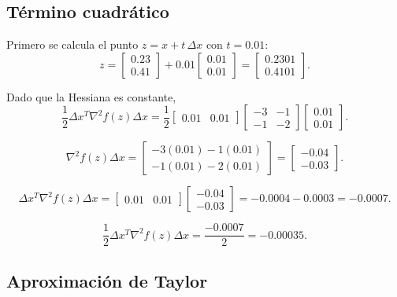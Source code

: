 \documentclass[12pt]{article}
\begin{document}
\subsection{Término cuadrático}

Primero se calcula el punto \(z = x + t\,\Delta x\) con \(t = 0.01\):
\[
z =
\begin{bmatrix} 0.23 \\ 0.41 \end{bmatrix}
+ 0.01
\begin{bmatrix} 0.01 \\ 0.01 \end{bmatrix}
=
\begin{bmatrix} 0.2301 \\ 0.4101 \end{bmatrix}.
\]

Dado que la Hessiana es constante,
\[
\frac{1}{2} \Delta x^T \nabla^2 f(z) \Delta x
= \frac{1}{2}
\begin{bmatrix} 0.01 & 0.01 \end{bmatrix}
\begin{bmatrix}
-3 & -1 \\
-1 & -2
\end{bmatrix}
\begin{bmatrix} 0.01 \\ 0.01 \end{bmatrix}.
\]

\[
\nabla^2 f(z) \Delta x =
\begin{bmatrix}
-3(0.01) - 1(0.01) \\
-1(0.01) - 2(0.01)
\end{bmatrix}
=
\begin{bmatrix}
-0.04 \\
-0.03
\end{bmatrix}.
\]

\[
\Delta x^T \nabla^2 f(z) \Delta x =
\begin{bmatrix} 0.01 & 0.01 \end{bmatrix}
\begin{bmatrix} -0.04 \\ -0.03 \end{bmatrix}
= -0.0004 - 0.0003 = -0.0007.
\]

\[
\frac{1}{2} \Delta x^T \nabla^2 f(z) \Delta x = \frac{-0.0007}{2} = -0.00035.
\]

\subsection{Aproximación de Taylor}
\end{document}
